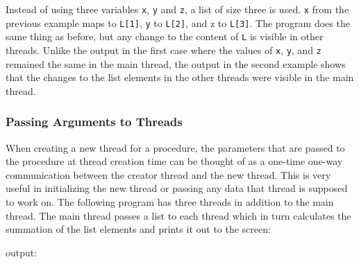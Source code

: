 \noindent
Instead of using three variables \texttt{x},
\texttt{y} and \texttt{z}, a list of size three
is used. \texttt{x} from the previous example maps to
\texttt{L[1]}, \texttt{y} to
\texttt{L[2]}, and z to \texttt{L[3]}. The
program does the same thing as before, but any
change to the content of \texttt{L} is visible in other
threads. Unlike the output in the first case where the values of
\texttt{x}, \texttt{y}, and \texttt{z}
remained the same in the main thread, the output in the second example
shows that the changes to the list elements in the other threads were
visible in the main thread.

\subsubsection[Passing Arguments to Threads]{Passing Arguments to
Threads}

When creating a new thread for a procedure, the parameters that are
passed to the procedure at thread creation time can be thought of as a
one-time one-way communication between the creator thread and the new
thread. This is very useful in initializing the new thread or passing
any data that thread is supposed to work on. The following program has
three threads in addition to the main thread. The main thread passes a
list to each thread which in turn calculates the summation of the list
elements and prints it out to the screen:


\noindent
output:

